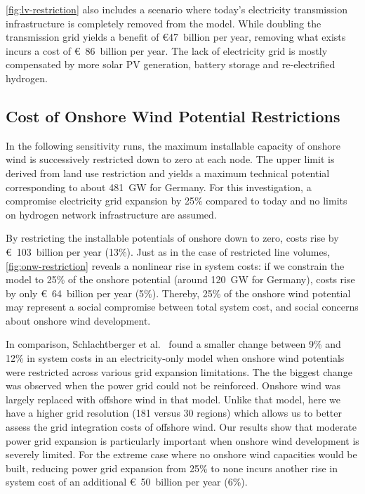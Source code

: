 \cref{fig:lv-restriction} also includes a scenario where today's electricity
transmission infrastructure is completely removed from the model. While doubling
the transmission grid yields a benefit of \euro47~billion per year, removing
what exists incurs a cost of \euro~86~billion per year. The lack of electricity
grid is mostly compensated by more solar PV generation, battery storage and
re-electrified hydrogen.

\subsection{Cost of Onshore Wind Potential Restrictions}
\label{sec:si:onw}

In the following sensitivity runs, the maximum installable capacity of onshore
wind is successively restricted down to zero at each node. The upper limit is
derived from land use restriction and yields a maximum technical potential
corresponding to about \SI{481}{\giga\watt} for Germany. For this investigation,
a compromise electricity grid expansion by 25\% compared to today and no limits
on hydrogen network infrastructure are assumed.

By restricting the installable potentials of onshore down to zero, costs rise by
\euro~103~billion per year (13\%). Just as in the case of restricted line volumes,
\cref{fig:onw-restriction} reveals a nonlinear rise in system costs: if we
constrain the model to 25\% of the onshore potential (around 120~GW for Germany),
costs rise by only \euro~64~billion per year (5\%). Thereby, 25\% of the onshore
wind potential may represent a social compromise between total system cost, and
social concerns about onshore wind development.

In comparison, Schlachtberger et al.~\cite{schlachtbergerCostOptimal2018} found
a smaller change between 9\% and 12\% in system costs in an electricity-only
model when onshore wind potentials were restricted across various grid expansion
limitations. The the biggest change was observed when the power grid could not
be reinforced. Onshore wind was largely replaced with offshore wind in that
model. Unlike that model, here we have a higher grid resolution (181 versus 30
regions) which allows us to better assess the grid integration costs of offshore
wind. Our results show that moderate power grid expansion is particularly
important when onshore wind development is severely limited. For the extreme
case where no onshore wind capacities would be built, reducing power grid
expansion from 25\% to none incurs another rise in system cost of an additional
\euro~50~billion per year (6\%).

